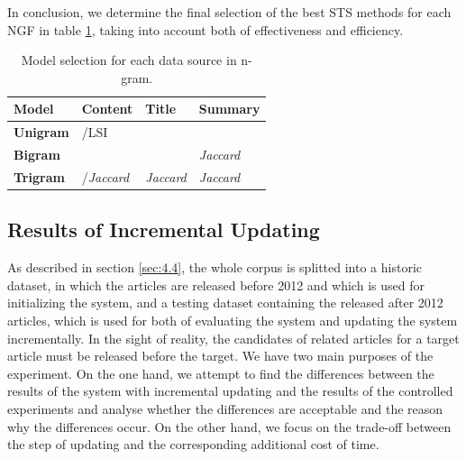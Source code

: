 In conclusion, we determine the final selection of the best STS methods for each NGF in table \ref{tab:select}, taking into account both of effectiveness and efficiency.

\begin{table}[!htb]
\centering
\begin{tabularx}{0.8\textwidth}{|X|X|X|X|}
\hline
\textbf{Model} & \textbf{Content} & \textbf{Title} & \textbf{Summary} \\ \hline
\textbf{Unigram} & \tfidf{}/LSI & \tfidf{} & \tfidf{} \\ \hline
\textbf{Bigram} & \tfidf{} & \tfidf{} & \textit{Jaccard} \\ \hline
\textbf{Trigram} & \tfidf{}/\textit{Jaccard} & \textit{Jaccard} & \textit{Jaccard} \\ \hline
\end{tabularx}
\caption{Model selection for each data source in n-gram.}
\label{tab:select}
\end{table}

\bigbreak


\subsection{Results of Incremental Updating}
\label{sec:5.4}

As described in section \ref{sec:4.4}, the whole corpus is splitted into a historic dataset, in which the articles are released before 2012 and which is used for initializing the system, and a testing dataset containing the released after 2012 articles, which is used for both of evaluating the system and updating the system incrementally. In the sight of reality, the candidates of related articles for a target article must be released before the target. We have two main purposes of the experiment. On the one hand, we attempt to find the differences between the results of the system with incremental updating and the results of the controlled experiments and analyse whether the differences are acceptable and the reason why the differences occur. On the other hand, we focus on the trade-off between the step of updating and the corresponding additional cost of time. 

